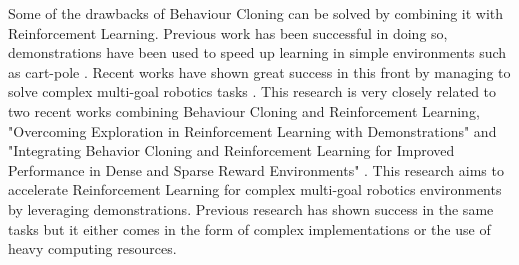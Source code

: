 Some of the drawbacks of Behaviour Cloning can be solved by combining it with Reinforcement Learning. Previous work has been successful in doing so, demonstrations have been used to speed up learning in simple environments such as cart-pole \cite{RLFD}. Recent works have shown great success in this front by managing to solve complex multi-goal robotics tasks \cite{nair2018overcoming}. This research is very closely related to two recent works combining Behaviour Cloning and Reinforcement Learning, "Overcoming Exploration in Reinforcement Learning with Demonstrations" \cite{nair2018overcoming} and "Integrating Behavior Cloning and Reinforcement Learning for Improved Performance in Dense and Sparse Reward Environments" \cite{goecks2020integrating}. This research aims to accelerate Reinforcement Learning for complex multi-goal robotics environments by leveraging demonstrations. Previous research has shown success in the same tasks but it either comes in the form of complex implementations or the use of heavy computing resources. \\